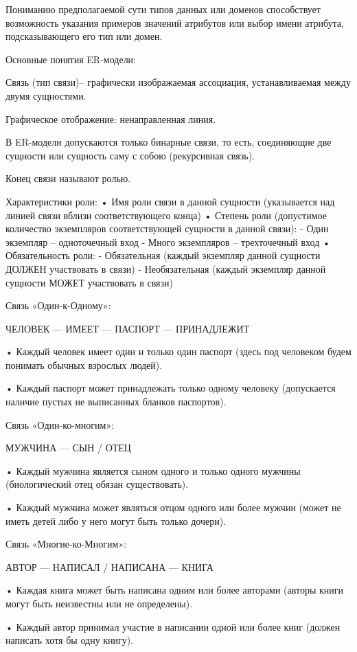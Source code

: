 \documentclass[a4paper,12pt]{article}
\begin{document}
Пониманию предполагаемой сути типов данных или доменов способствует 
возможность указания примеров значений атрибутов или выбор имени 
атрибута, подсказывающего его тип или домен.

Основные понятия ER-модели:

Связь (тип связи)– графически изображаемая ассоциация, устанавливаемая 
между двумя сущностями.

Графическое отображение: ненаправленная линия.

В ER-модели допускаются только бинарные связи, то есть, соединяющие две 
сущности или сущность саму с собою (рекурсивная связь).

Конец связи называют ролью.

Характеристики роли:
• Имя роли связи в данной сущности (указывается над линией связи вблизи соответствующего конца)
• Степень роли (допустимое количество экземпляров соответствующей 
сущности в данной связи):
   - Один экземпляр – одноточечный вход
   - Много экземпляров – трехточечный вход
• Обязательность роли:
   - Обязательная (каждый экземпляр данной сущности ДОЛЖЕН 
участвовать в связи)
   - Необязательная (каждый экземпляр данной сущности МОЖЕТ 
участвовать в связи)

Связь «Один-к-Одному»:

ЧЕЛОВЕК --- ИМЕЕТ --- ПАСПОРТ --- ПРИНАДЛЕЖИТ

• Каждый человек имеет один и только один паспорт (здесь под человеком будем понимать обычных 
взрослых людей).

• Каждый паспорт может принадлежать только одному человеку (допускается наличие пустых не 
выписанных бланков паспортов).

Связь «Один-ко-многим»:

МУЖЧИНА --- СЫН / ОТЕЦ

• Каждый мужчина является сыном одного и только 
одного мужчины (биологический отец обязан 
существовать).

• Каждый мужчина может являться отцом одного или 
более мужчин (может не иметь детей либо у него могут 
быть только дочери).

Связь «Многие-ко-Многим»:

АВТОР --- НАПИСАЛ / НАПИСАНА --- КНИГА

• Каждая книга может быть написана одним или более 
авторами (авторы книги могут быть неизвестны или не 
определены).

• Каждый автор принимал участие в написании одной 
или более книг (должен написать хотя бы одну книгу).
\end{document}
